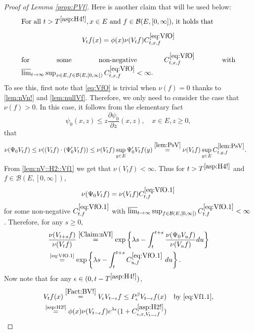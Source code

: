 \documentclass[12pt,a4paper]{amsart}
\numberwithin{equation}{section}
\theoremstyle{plain}
\theoremstyle{definition}
\theoremstyle{remark}
\begin{document}
\begin{proof}[Proof of Lemma \ref{prop:PVf}]
	
	Here is another claim that will be used below:
\begin{equation}
\begin{minipage}{0.9\textwidth}
	For all $t> T^{\eqref{asp:H4!}}, x\in E$ and $f\in \mathcal B(E,[0,\infty])$, it holds that \[V_t f(x) = \phi(x) \nu(V_tf) C^{\eqref{eq:VfO}}_{t,x,f}\] for some non-negative $C^{\eqref{eq:VfO}}_{t,x,f}$ with $\varlimsup_{t\to \infty} \sup_{x\in E, f\in \mathcal B(E,[0,\infty])} C^{\eqref{eq:VfO}}_{t,x,f} <\infty$.
\end{minipage} \label{eq:VfO}
\end{equation}
	To see this, first note that \eqref{eq:VfO} is trivial when $\nu(f) = 0$ thanks to \eqref{lem:nVn!} and \eqref{lem:nullVf}.
	Therefore, we only need to consider the case that $\nu(f)>0$.
	In this case, it follows from the elementary fact
\begin{equation}\label{e:derofpsi0}
	\psi_0(x,z)
	\leq z \frac{\partial \psi_0}{\partial z}(x,z),
	\quad x\in E, z\geq 0,
\end{equation}
	that
\begin{align}
	&\nu(\Psi_0 V_tf)
	\leq \nu((V_tf)\cdot (\Psi_0' V_tf)) \leq \nu(V_tf) \sup_{y\in E} \Psi_0' V_tf(y)
	\overset{\eqref{lem:PsV}}= \nu(V_tf) \sup_{y\in E} C^{\eqref{lem:PsV}}_{t,y,f}.
\end{align}
	From \eqref{lem:nV::H2::Vf1}  we get that $\nu(V_tf) <\infty$.
	Thus for $t> T^{\eqref{asp:H4!}}$ and $f\in \mathcal B(E,[0,\infty])$,
\begin{equation}
	\nu(\Psi_0 V_t f)  = \nu(V_tf) C^{\eqref{eq:VfO.1}}_{t,f} \label{eq:VfO.1}
\end{equation}
	for some non-negative $C^{\eqref{eq:VfO.1}}_{t,f} $ with $\varlimsup_{t\to \infty} \sup_{f\in \mathcal B(E,[0,\infty])}C^{\eqref{eq:VfO.1}}_{t,f}  < \infty$.
	Therefore, for any $s\geq 0$,
\begin{align}
	&  \frac{\nu(V_{t+s} f)} {\nu(V_t f)} \overset{\eqref{Claim:nVI}}= \exp\left\{ \lambda s - \int_t^{t+s} \frac{\nu(\Psi_0 V_u f) }{\nu(V_u f)} du\right\}
	\\&\label{eq:VfO.2} \overset{\text{\eqref{eq:VfO.1}}}= \exp\left\{ \lambda s - \int_t^{t+s} C^{\eqref{eq:VfO.1}}_{u,f} ~du\right\}.
\end{align}
Now note that for any $\epsilon\in (0, t- T^{\eqref{asp:H4!}})$,
\begin{align}
	&V_{t}f(x) \overset{\eqref{Fact:BV!}}= V_{\epsilon} V_{t-\epsilon} f\leq P_\epsilon^\beta V_{t-\epsilon} f(x)\quad\text{by \eqref{eq:Vf1.1}},
	\\& \overset{\text{\eqref{asp:H2!}}}= \phi(x) \nu(V_{t-\epsilon}f) e^{\lambda  \epsilon} (1+C_{\epsilon,x, V_{t-\epsilon} f}^{\eqref{asp:H2!}} )

\end{align}
\end{proof}
\end{document}

